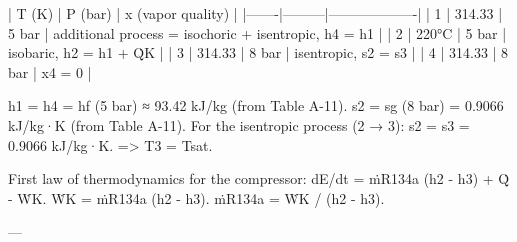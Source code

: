 | T (K) | P (bar) | x (vapor quality) |  
|-------|---------|-------------------|  
| 1     | 314.33  | 5 bar            | additional process = isochoric + isentropic, h4 = h1 |  
| 2     | 220°C   | 5 bar            | isobaric, h2 = h1 + Q̇K |  
| 3     | 314.33  | 8 bar            | isentropic, s2 = s3 |  
| 4     | 314.33  | 8 bar            | x4 = 0 |  

h1 = h4 = hf (5 bar) ≈ 93.42 kJ/kg (from Table A-11).  
s2 = sg (8 bar) = 0.9066 kJ/kg·K (from Table A-11).  
For the isentropic process (2 → 3): s2 = s3 = 0.9066 kJ/kg·K.  
=> T3 = Tsat.  

First law of thermodynamics for the compressor:  
dE/dt = ṁR134a (h2 - h3) + Q̇ - ẆK.  
ẆK = ṁR134a (h2 - h3).  
ṁR134a = ẆK / (h2 - h3).  

---